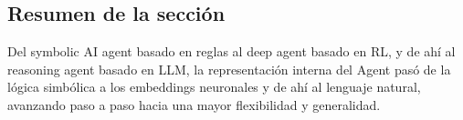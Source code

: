 \subsection{Resumen de la sección}

Del symbolic AI agent basado en reglas al deep agent basado en RL, y de ahí al reasoning agent basado en LLM, la representación interna del Agent pasó de la lógica simbólica a los embeddings neuronales y de ahí al lenguaje natural, avanzando paso a paso hacia una mayor flexibilidad y generalidad.
